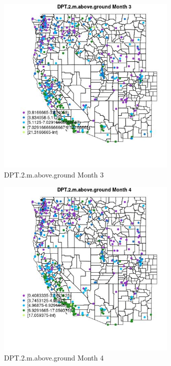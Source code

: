 \begin{figure} 
\centering  
\includegraphics[width=0.77\textwidth]{Code_Outputs/ML_input_report_ML_input_PM25_Step5_part_d_de_duplicated_aves_ML_input_MapObsMo3DPT2maboveground.jpg} 
\caption{\label{fig:ML_input_report_ML_input_PM25_Step5_part_d_de_duplicated_aves_ML_inputMapObsMo3DPT2maboveground}DPT.2.m.above.ground Month 3} 
\end{figure} 
 

\clearpage 

\begin{figure} 
\centering  
\includegraphics[width=0.77\textwidth]{Code_Outputs/ML_input_report_ML_input_PM25_Step5_part_d_de_duplicated_aves_ML_input_MapObsMo4DPT2maboveground.jpg} 
\caption{\label{fig:ML_input_report_ML_input_PM25_Step5_part_d_de_duplicated_aves_ML_inputMapObsMo4DPT2maboveground}DPT.2.m.above.ground Month 4} 
\end{figure} 
 

